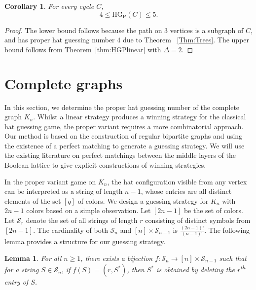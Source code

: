 \documentclass[a4paper,11pt]{amsproc}
\theoremstyle{plain}
\newtheorem{Lemma} [Theorem] {Lemma}
\newtheorem{Corollary} [Theorem] {Corollary}
\theoremstyle{definition}
\newcommand{\HGP}{\mathrm{HG_{P}}}
\renewcommand{\th}{\textsuperscript{th} }
\begin{document}
\begin{Corollary}\label{cor:cycles}
For every cycle $C$, 
$$4\le \HGP(C) \le 5.$$
\end{Corollary}
\begin{proof}
The lower bound follows because the path on $3$ vertices is a subgraph of $C$, and has proper hat guessing number $4$ due to Theorem~ \ref{Thm:Trees}. The upper bound follows from Theorem~\ref{thm:HGPlinear} with $\Delta=2$.
\end{proof}



\section{Complete graphs}
\label{sec:complete_graphs}

In this section, we determine the proper hat guessing number of the complete graph $K_n$. 
Whilst a linear strategy produces a winning strategy for the classical hat guessing game, 
the proper variant requires a more combinatorial approach. 
Our method is based on the 
construction of regular bipartite graphs and using the existence of a perfect 
matching to generate a guessing strategy. 
We will use the existing literature on perfect matchings between the middle layers of the Boolean lattice to give explicit constructions of winning strategies.
\newline

In the proper variant game on $K_n$, the hat configuration visible from any vertex can be interpreted as a string of length $n-1$, whose entries are all distinct elements of the set $[q]$ of colors.
We design a guessing strategy for $K_n$ with $2n-1$ colors based on a simple observation. Let $[2n-1]$ be the set of colors. Let $\mathcal{S}_{r}$ denote the set of all strings of length $r$ consisting of distinct symbols from $[2n-1]$. The cardinality of both $\mathcal{S}_n$ and $[n] \times \mathcal{S}_{n-1}$ is $\frac{(2n-1)!}{(n-1)!}$.
The following lemma provides a structure for our guessing strategy.   


\begin{Lemma}
 \label{Lm:Perfect matching}
For all $n \geq 1$, there exists a bijection $f : \mathcal{S}_n \rightarrow [n] \times \mathcal{S}_{n-1}$ such that for a string $S \in \mathcal{S}_n$, if $f(S) = (r, S^*)$, then $S^*$ is obtained by deleting the $r$\th entry of $S$. 
\end{Lemma}
\end{document}
